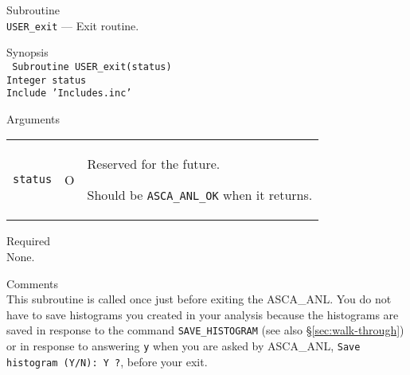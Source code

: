 \vspace{1cm}

\newpage
\begin{description}
\item{Subroutine}\\
   {\tt USER\_exit} --- Exit routine.
\item{Synopsis}\\
   {\tt
      Subroutine USER\_exit(status) \\
      Integer status \\
      Include 'Includes.inc'
   }
\item{Arguments} \\
 \begin{tabular}{l@{\ (}c@{)\ }p{}}
   {\tt status} & O & Reserved for the future.\par
                      Should be {\tt ASCA\_ANL\_OK} when it returns.
 \end{tabular}
\item{Required} \\
   None.
\item{Comments} \\
   This subroutine is called once
   just before exiting the ASCA\_ANL.
   You do not have to save histograms you created in your analysis
   because the histograms are saved in response to the command
   {\tt SAVE\_HISTOGRAM} (see also \S \ref{sec:walk-through})
   or in response to answering {\tt y} when you are asked by ASCA\_ANL,
   {\tt Save histogram (Y/N): Y ?}, before your exit.
\end{description}






